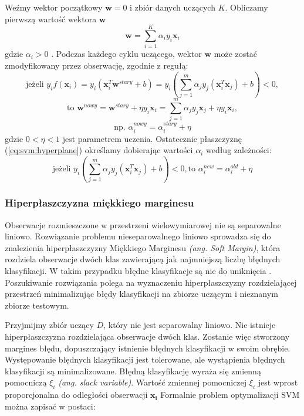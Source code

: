 \documentclass[a4paper,12pt,twoside,openany]{report}
\newcommand{\ang}[1]{\textit{(ang. #1)}}
\newcommand{\Eq}[1]{(\ref{#1})}
\renewcommand{\vec}[1]{\bm{#1}}
\begin{document}
Weźmy wektor początkowy $\vec{w} = 0$ i zbiór danych uczących $K$.
Obliczamy pierwszą wartość wektora $\vec{w}$
\begin{equation}\label{eq:svm:hyperplane}
	{\vec{w}}=\sum_{i=1}^K \alpha_i y_i {\vec{x}}_i
\end{equation}
gdzie $\alpha_i>0$ \cite{Mittal2016}.
Podczas każdego cyklu uczącego, wektor $\vec{w}$ może zostać zmodyfikowany przez obserwację, 
zgodnie z regułą:
\begin{equation}
	\mbox{jeżeli } y_i f({\vec{x}}_i)=y_i ({\vec{x}}_i^T{\vec{w}}^{stary}+b)
	=y_i\left(\sum_{j=1}^m \alpha_j y_j({\vec{x}}_i^T{\vec{x}}_j)+b\right)<0,
\end{equation}
\begin{equation}
	\mbox{to } {\vec{w}}^{nowy}={\vec{w}}^{stary}+\eta y_i {\vec{x}}_i
	=\sum_{j=1}^{m} \alpha_j y_j\vec{x}_j +\eta y_i {\vec{x}}_i,
\end{equation}
\begin{equation}
	\mbox{np. }
	\alpha_i^{nowy}=\alpha_i^{stary}+\eta
\end{equation}
gdzie $0 < \eta < 1$ jest parametrem uczenia.
Ostatecznie płaszczyznę \Eq{eq:svm:hyperplane} określamy dobierając wartości $\alpha_i$ według zależności: 
\begin{equation}
	\mbox{jeżeli } y_i\left(\sum_{j=1}^m \alpha_j y_j({\vec{x}}_i^T\vec{x}_j)+b\right)<0,
	\mbox{to } \alpha_i^{new}=\alpha_i^{old}+\eta 
\end{equation}

\subsubsection{Hiperpłaszczyzna miękkiego marginesu}
Obserwacje rozmieszczone w przestrzeni wielowymiarowej nie są separowalne liniowo. 
Rozwiązanie problemu nieseparowalnego liniowo sprowadza się do znalezienia hiperpłaszczyzny Miękkiego Marginesu \ang{Soft Margin}, 
która rozdziela obserwacje dwóch klas zawierającą jak najmniejszą liczbę błędnych klasyfikacji.
W takim przypadku błędne klasyfikacje są nie do uniknięcia \cite{Dellepiane2015}.
Poszukiwanie rozwiązania polega na wyznaczeniu hiperpłaszczyzny rozdzielającej przestrzeń 
minimalizując błędy klasyfikacji na zbiorze uczącym i nieznanym zbiorze testowym.

Przyjmijmy zbiór uczący $D$, który nie jest separowalny liniowo. 
Nie istnieje hiperpłaszczyzna rozdzielająca obserwacje dwóch klas.
Zostanie więc stworzony margines błędu, dopuszczający istnienie błędnych klasyfikacji w swoim obrębie.
Występowanie błędnych klasyfikacji jest tolerowane, ale wystąpienia błędnych klasyfikacji są minimalizowane.
Błędną klasyfikację wyraża się zmienną pomocniczą $\xi_i$ \ang{slack variable}. 
Wartość zmiennej pomocniczej $\xi_i$ jest wprost proporcjonalna do odległości obserwacji $\vec{x_i}$
Formalnie problem optymalizacji SVM można zapisać w postaci:
\end{document}
